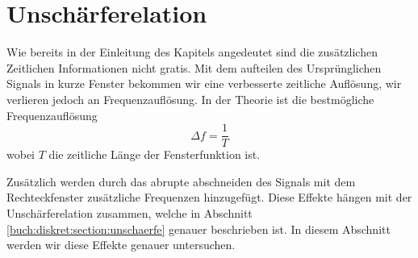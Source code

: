 %
%
%
%
\section{Unschärferelation
\label{sonogramm:section:teil1}}
Wie bereits in der Einleitung des Kapitels angedeutet sind die zusätzlichen
Zeitlichen Informationen nicht gratis. 
Mit dem aufteilen des Ursprünglichen Signals in kurze Fenster bekommen wir eine
verbesserte zeitliche Auflösung, wir verlieren jedoch an Frequenzauflösung.
In der Theorie ist die bestmögliche Frequenzauflösung 
\begin{equation}
    \Delta f = \frac{1}{T}
\end{equation}
wobei $T$ die zeitliche Länge der Fensterfunktion ist.

Zusätzlich werden durch das abrupte abschneiden des Signals mit dem Rechteckfenster
zusätzliche Frequenzen hinzugefügt. 
Diese Effekte hängen mit der Unschärferelation zusammen, welche in Abschnitt
\ref{buch:diskret:section:unschaerfe} genauer beschrieben ist.
In diesem Abschnitt werden wir diese Effekte genauer untersuchen.
